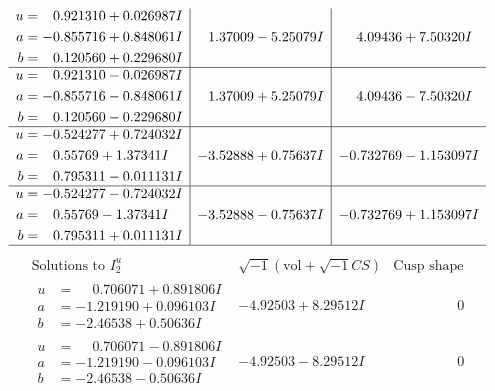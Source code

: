 \documentclass[1p]{elsarticle_modified}
\theoremstyle{definition}
\newcommand{\I}{\sqrt{-1}}
\begin{document}
$$\begin{array}{c|c|c}
\begin{aligned}
u &= \phantom{-}0.921310 + 0.026987 I \\
a &= -0.855716 + 0.848061 I \\
b &= \phantom{-}0.120560 + 0.229680 I\end{aligned}
 & \phantom{-}1.37009 - 5.25079 I & \phantom{-}4.09436 + 7.50320 I \\ \hline\begin{aligned}
u &= \phantom{-}0.921310 - 0.026987 I \\
a &= -0.855716 - 0.848061 I \\
b &= \phantom{-}0.120560 - 0.229680 I\end{aligned}
 & \phantom{-}1.37009 + 5.25079 I & \phantom{-}4.09436 - 7.50320 I \\ \hline\begin{aligned}
u &= -0.524277 + 0.724032 I \\
a &= \phantom{-}0.55769 + 1.37341 I \\
b &= \phantom{-}0.795311 - 0.011131 I\end{aligned}
 & -3.52888 + 0.75637 I & -0.732769 - 1.153097 I \\ \hline\begin{aligned}
u &= -0.524277 - 0.724032 I \\
a &= \phantom{-}0.55769 - 1.37341 I \\
b &= \phantom{-}0.795311 + 0.011131 I\end{aligned}
 & -3.52888 - 0.75637 I & -0.732769 + 1.153097 I\\
 \hline 
 \end{array}$$\newpage$$\begin{array}{c|c|c}  
\text{Solutions to }I^u_{2}& \I (\text{vol} + \sqrt{-1}CS) & \text{Cusp shape}\\
 \hline 
\begin{aligned}
u &= \phantom{-}0.706071 + 0.891806 I \\
a &= -1.219190 + 0.096103 I \\
b &= -2.46538 + 0.50636 I\end{aligned}
 & -4.92503 + 8.29512 I & \phantom{-0.000000 } 0 \\ \hline\begin{aligned}
u &= \phantom{-}0.706071 - 0.891806 I \\
a &= -1.219190 - 0.096103 I \\
b &= -2.46538 - 0.50636 I\end{aligned}
 & -4.92503 - 8.29512 I & \phantom{-0.000000 } 0 \\ \hline\begin{aligned}

\end{aligned}
\end{array}$$
\end{document}
